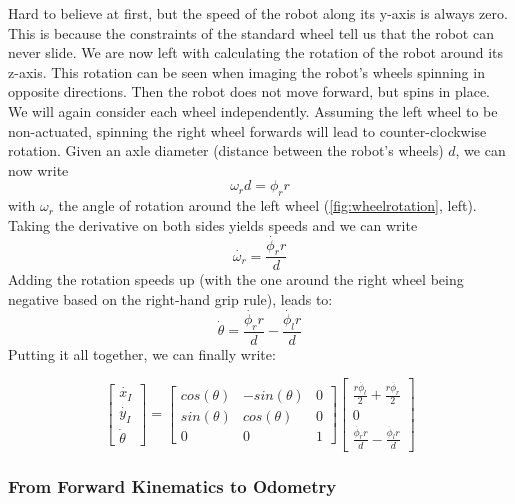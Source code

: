 Hard to believe at first, but the speed of the robot along its y-axis is always zero. This is because the constraints of the standard wheel tell us that the robot can never slide.
We are now left with calculating the rotation of the robot around its z-axis. This rotation can be seen when imaging the robot's wheels spinning in opposite directions. Then the robot does not move forward, but spins in place.
We will again consider each wheel independently. Assuming the left wheel to be non-actuated, spinning the right wheel forwards will lead to counter-clockwise rotation. Given an axle diameter (distance between the robot's wheels) $d$, we can now write
\begin{equation}
\omega_r d = \phi_r r
\end{equation}
with $\omega_r$ the angle of rotation around the left wheel (\cref{fig:wheelrotation}, left). Taking the derivative on both sides yields speeds and we can write
\begin{equation}
\dot{\omega_r} = \frac{\dot{\phi_r} r}{d}
\end{equation}
Adding the rotation speeds up (with the one around the right wheel being negative based on the right-hand grip rule), leads to:
%
\begin{equation}
\dot{\theta}=\frac{\dot{\phi_r} r}{d}-\frac{\dot{\phi_l} r}{d}
\end{equation}
%
Putting it all together, we can finally write:

\begin{equation}\label{eq:kinematics:forward:mobile}
\left[\begin{array}{c} \dot{x_I}\\\dot{y_I}\\\dot{\theta}\end{array}\right]=\left[\begin{array}{ccc}
cos(\theta) & -sin(\theta) & 0 \\
sin(\theta) & cos(\theta) & 0 \\
0 & 0 & 1\end{array}\right]\left[\begin{array}{c}\frac{r\dot{\phi_l}}{2}+\frac{r\dot{\phi_r}}{2}\\0\\\frac{\dot{\phi_r} r}{d}-\frac{\dot{\phi_l} r}{d}\end{array}\right]
\end{equation}

\subsubsection{From Forward Kinematics to Odometry}


